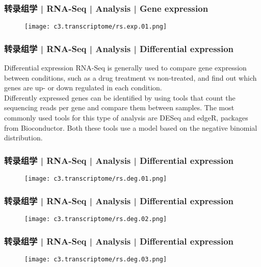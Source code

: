 \begin{frame}
  \frametitle{转录组学 | RNA-Seq | Analysis | Gene expression}
  \begin{figure}
    \centering
    \texttt{[image: c3.transcriptome/rs.exp.01.png]}
  \end{figure}
\end{frame}

\begin{frame}
  \frametitle{转录组学 | RNA-Seq | Analysis | Differential expression}
  \begin{block}{Differential expression}
 RNA-Seq is generally used to compare gene expression between conditions, such as a drug treatment vs non-treated, and find out which genes are up- or down regulated in each condition.\\
 \vspace{0.5em}
 Differently expressed genes can be identified by using tools that count the sequencing reads per gene and compare them between samples. The most commonly used tools for this type of analysis are DESeq and edgeR, packages from Bioconductor. Both these tools use a model based on the negative binomial distribution.
  \end{block}
\end{frame}

\begin{frame}
  \frametitle{转录组学 | RNA-Seq | Analysis | Differential expression}
  \begin{figure}
    \centering
    \texttt{[image: c3.transcriptome/rs.deg.01.png]}
  \end{figure}
\end{frame}

\begin{frame}
  \frametitle{转录组学 | RNA-Seq | Analysis | Differential expression}
  \begin{figure}
    \centering
    \texttt{[image: c3.transcriptome/rs.deg.02.png]}
  \end{figure}
\end{frame}

\begin{frame}
  \frametitle{转录组学 | RNA-Seq | Analysis | Differential expression}
  \begin{figure}
    \centering
    \texttt{[image: c3.transcriptome/rs.deg.03.png]}
  \end{figure}
\end{frame}

